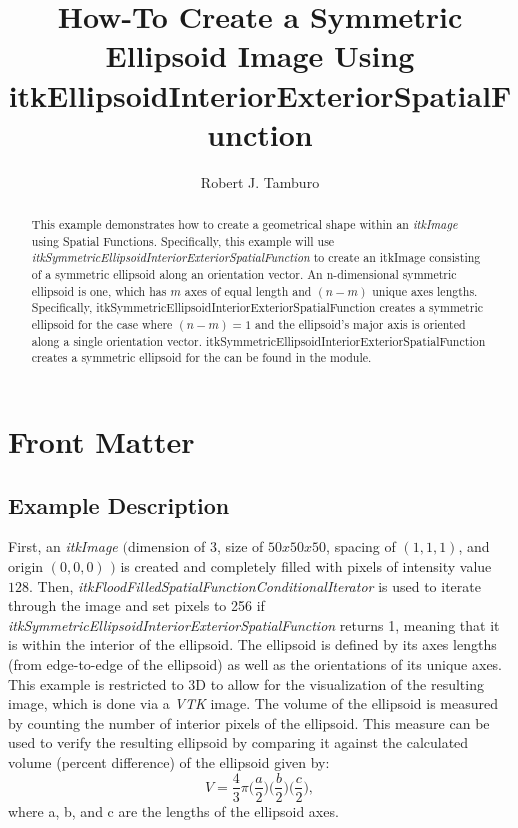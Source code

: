 \documentclass{InsightHowto}
\title{How-To Create a Symmetric Ellipsoid Image Using itkEllipsoidInteriorExteriorSpatialFunction}
\author{Robert J. Tamburo}
\begin{document}
\maketitle

%


\ifhtml
\chapter*{Front Matter\label{front}}
\fi

\begin{abstract}
\noindent This example demonstrates how to create a geometrical shape within an
\emph{itkImage} using Spatial Functions. Specifically, this example will use
\emph{itkSymmetricEllipsoidInteriorExteriorSpatialFunction} to create an itkImage consisting
of a symmetric ellipsoid along an orientation vector.  An n-dimensional symmetric ellipsoid
is one, which has $m$ axes of equal length and $(n-m)$ unique axes lengths.  Specifically,
itkSymmetricEllipsoidInteriorExteriorSpatialFunction creates a symmetric ellipsoid for the
case where $(n-m)=1$ and the ellipsoid's major axis is oriented along a single orientation
vector. itkSymmetricEllipsoidInteriorExteriorSpatialFunction creates a symmetric ellipsoid
for the can be found in the  module.
\end{abstract}

\tableofcontents

\section{Example Description}

First, an \emph{itkImage} $\big($dimension of $3$, size of $50x50x50$, spacing of $(1,1,1)$,
and origin $(0,0,0)$ $\big)$ is created and completely filled with pixels of intensity value
$128$. Then, \emph{itkFloodFilledSpatialFunctionConditionalIterator} is used to iterate
through the image and set pixels to 256 if
\emph{itkSymmetricEllipsoidInteriorExteriorSpatialFunction} returns 1, meaning that it is
within the interior of the ellipsoid. The ellipsoid is defined by its axes lengths (from
edge-to-edge of the ellipsoid) as well as the orientations of its unique axes. This example
is restricted to 3D to allow for the visualization of the resulting image, which is done via
a \emph{VTK} image. The volume of the ellipsoid is measured by counting the number of
interior pixels of the ellipsoid. This measure can be used to verify the resulting ellipsoid
by comparing it against the calculated volume (percent difference) of the ellipsoid given
by:
\begin{equation}\label{1}
  V=\frac{4}{3} \pi \Big(\frac{a}{2}\Big) \Big(\frac{b}{2}\Big) \Big(\frac{c}{2}\Big),
\end{equation}
where a, b, and c are the lengths of the ellipsoid axes.
\end{document}
